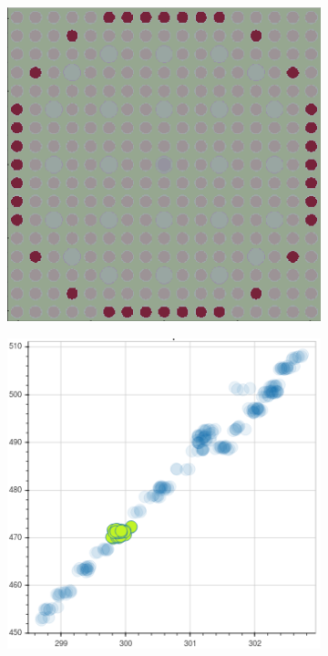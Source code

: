 \begin{figure}[h!]
\begin{subfigure}{0.45\textwidth}
  \caption{}
  \label{fig:chap10-fiss-mean-pcm-mgxs}
\end{subfigure}
\begin{subfigure}{0.45\textwidth}
  \centering
  \includegraphics[width=0.9\linewidth]{figures/unsupervised/features/assm-16/u235-fiss/mean-pcm/geometry-2}
  \caption{}
  \label{fig:chap10-fiss-mean-pcm-geom-2}
\end{subfigure}%
\begin{subfigure}{0.45\textwidth}
  \centering
  \includegraphics[width=0.9\linewidth]{figures/unsupervised/features/assm-16/u235-fiss/mean-pcm/mgxs-2}

\end{subfigure}
\end{figure}
